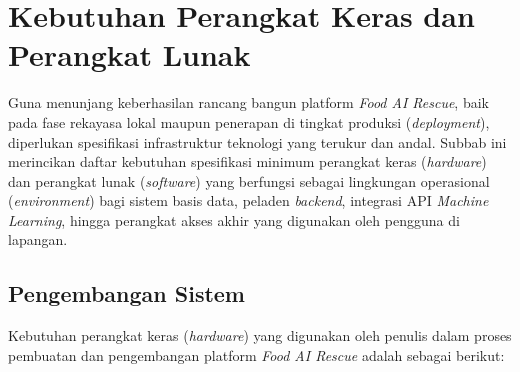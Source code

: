 \section{Kebutuhan Perangkat Keras dan Perangkat Lunak}

Guna menunjang keberhasilan rancang bangun platform \textit{Food AI Rescue}, baik pada fase rekayasa lokal maupun penerapan di tingkat produksi (\textit{deployment}), diperlukan spesifikasi infrastruktur teknologi yang terukur dan andal. Subbab ini merincikan daftar kebutuhan spesifikasi minimum perangkat keras (\textit{hardware}) dan perangkat lunak (\textit{software}) yang berfungsi sebagai lingkungan operasional (\textit{environment}) bagi sistem basis data, peladen \textit{backend}, integrasi API \textit{Machine Learning}, hingga perangkat akses akhir yang digunakan oleh pengguna di lapangan.

\subsection{Pengembangan Sistem}
\label{subsec:kebutuhan-pengembangan}

Kebutuhan perangkat keras (\textit{hardware}) yang digunakan oleh penulis dalam proses pembuatan dan pengembangan platform \textit{Food AI Rescue} adalah sebagai berikut:

